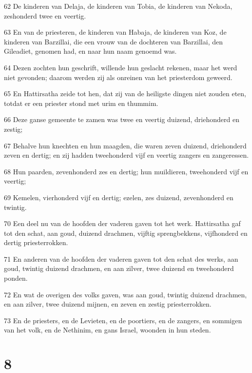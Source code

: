 \par 62 De kinderen van Delaja, de kinderen van Tobia, de kinderen van Nekoda, zeshonderd twee en veertig.
\par 63 En van de priesteren, de kinderen van Habaja, de kinderen van Koz, de kinderen van Barzillai, die een vrouw van de dochteren van Barzillai, den Gileadiet, genomen had, en naar hun naam genoemd was.
\par 64 Dezen zochten hun geschrift, willende hun geslacht rekenen, maar het werd niet gevonden; daarom werden zij als onreinen van het priesterdom geweerd.
\par 65 En Hattirsatha zeide tot hen, dat zij van de heiligste dingen niet zouden eten, totdat er een priester stond met urim en thummim.
\par 66 Deze ganse gemeente te zamen was twee en veertig duizend, driehonderd en zestig;
\par 67 Behalve hun knechten en hun maagden, die waren zeven duizend, driehonderd zeven en dertig; en zij hadden tweehonderd vijf en veertig zangers en zangeressen.
\par 68 Hun paarden, zevenhonderd zes en dertig; hun muildieren, tweehonderd vijf en veertig;
\par 69 Kemelen, vierhonderd vijf en dertig; ezelen, zes duizend, zevenhonderd en twintig.
\par 70 Een deel nu van de hoofden der vaderen gaven tot het werk. Hattirsatha gaf tot den schat, aan goud, duizend drachmen, vijftig sprengbekkens, vijfhonderd en dertig priesterrokken.
\par 71 En anderen van de hoofden der vaderen gaven tot den schat des werks, aan goud, twintig duizend drachmen, en aan zilver, twee duizend en tweehonderd ponden.
\par 72 En wat de overigen des volks gaven, was aan goud, twintig duizend drachmen, en aan zilver, twee duizend mijnen, en zeven en zestig priesterrokken.
\par 73 En de priesters, en de Levieten, en de poortiers, en de zangers, en sommigen van het volk, en de Nethinim, en gans Israel, woonden in hun steden.

\chapter{8}

